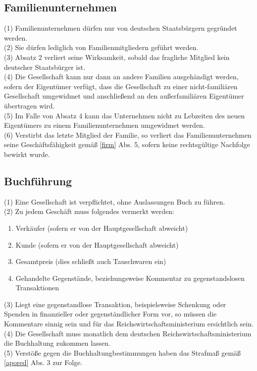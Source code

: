 \documentclass{article}
\begin{document}
\subsection{Familienunternehmen} \label{familien}
(1) Familienunternehmen dürfen nur von deutschen Staatsbürgern gegründet werden.\\
(2) Sie dürfen lediglich von Familienmitgliedern geführt werden.\\
(3) Absatz 2 verliert seine Wirksamkeit, sobald das fragliche Mitglied kein deutscher Staatsbürger ist.\\
(4) Die Gesellschaft kann nur dann an andere Familien ausgehändigt werden, sofern der Eigentümer verfügt, dass die Gesellschaft zu einer nicht-familiären Gesellschaft umgewidmet und anschließend an den außerfamiliären Eigentümer übertragen wird.\\
(5) Im Falle von Absatz 4 kann das Unternehmen nicht zu Lebzeiten des neuen Eigentümers zu einem Familienunternehmen umgewidmet werden.\\
(6) Verstirbt das letzte Mitglied der Familie, so verliert das Familienunternehmen seine Geschäftsfähigkeit gemäß \ref{firm} Abs. 5, sofern keine rechtsgültige Nachfolge bewirkt wurde.

\subsection{Buchführung} \label{buch}
(1) Eine Gesellschaft ist verpflichtet, ohne Auslassungen Buch zu führen.\\
(2) Zu jedem Geschäft muss folgendes vermerkt werden:
\begin{enumerate}
	\item Verkäufer (sofern er von der Hauptgesellschaft abweicht)
	\item Kunde (sofern er von der Hauptgesellschaft abweicht)
	\item Gesamtpreis (dies schließt auch Tauschwaren ein)
	\item Gehandelte Gegenstände, beziehungsweise Kommentar zu gegenstandslosen Transaktionen
\end{enumerate}
(3) Liegt eine gegenstandlose Transaktion, beispielsweise Schenkung oder Spenden in finanzieller oder gegenständlicher Form  vor, so müssen die Kommentare sinnig sein und für das Reichswirtschaftsministerium ersichtlich sein.\\
(4) Die Gesellschaft muss monatlich dem deutschen Reichswirtschaftsministerium die Buchhaltung zukommen lassen.\\
(5) Verstöße gegen die Buchhaltungbestimmungen haben das Strafmaß gemäß \ref{apored} Abs. 3 zur Folge.
\end{document}
